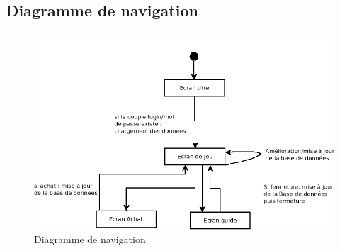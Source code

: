 \subsection{Diagramme de navigation}

    \begin{figure}[ht!]
        \centering
            \includegraphics[width=1\textwidth]{images/diagramme_de_navigation.png}
        \caption{Diagramme de navigation}
    \end{figure}
